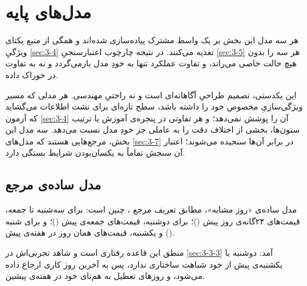 
\section{مدل‌های پایه}
\label{sec:3-6}

هر سه مدل این بخش بر یک واسط مشترک پیاده‌سازی شده‌اند و همگی از منبع یکتای ویژگیِ
\cref{sec:3-4} تغذیه می‌کنند. در نتیجه چارچوب اعتبارسنجیِ \cref{sec:3-5} هر سه را بدون هیچ حالت
خاصی می‌راند، و تفاوت عملکرد تنها به خودِ مدل بازمی‌گردد و نه به تفاوت در خوراک داده.

این یکدستی، تصمیم طراحیِ آگاهانه‌ای است و نه راحتیِ مهندسی. هر مدلی که مسیر
ویژگی‌سازیِ مخصوص خود را داشته باشد، سطح تازه‌ای برای نشت اطلاعات می‌گشاید که آزمون
\cref{sec:3-4} آن را پوشش نمی‌دهد؛ و هر تفاوتی در پنجره‌ی آموزش یا ترتیب ستون‌ها، بخشی از
اختلاف دقت را به عاملی جز خودِ مدل نسبت می‌دهد. سه مدل این بخش، مرجع‌هایی هستند که
مدل‌های \cref{sec:3-7} در برابر آن‌ها سنجیده می‌شوند؛ اعتبار آن سنجش تماماً به یکسان‌بودن
شرایط بستگی دارد.

\subsection*{مدل ساده‌ی مرجع}

مدل ساده‌ی «روز مشابه»، مطابق تعریف مرجع \cite{lago_forecasting_2021}، چنین است: برای
سه‌شنبه تا جمعه، قیمت‌های ۲۴گانه‌ی روز پیش ()؛ برای دوشنبه، قیمت‌های جمعه‌ی پیش
()؛ و برای شنبه و یکشنبه، قیمت‌های همان روز در هفته‌ی پیش ().

منطق این قاعده رفتاری است و شاهد تجربی‌اش در \cref{sec:3-3-3} آمد: دوشنبه با یکشنبه‌ی پیش از
خود شباهت ساختاری ندارد، پس به آخرین روز کاری ارجاع داده می‌شود، و روزهای تعطیل به
هم‌تای خود در هفته‌ی پیشین.

